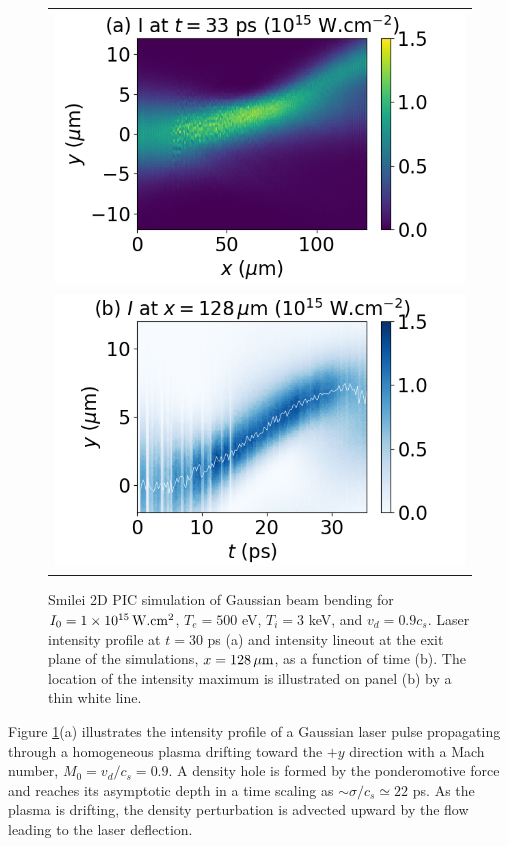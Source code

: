 \documentclass[%
 reprint,
 amsmath,amssymb,
 aps,
]{revtex4-1}
\begin{document}
\begin{figure}
\begin{tabular}{c}
\includegraphics[scale=0.49]{Figure/Ixy_1e15_M1p2_C6+.png} \\
\includegraphics[scale=0.49]{Figure/Iyt_1e15_M1p2_C6+.png}
\end{tabular}
\caption{ \label{fig:pic} Smilei 2D PIC simulation of Gaussian beam bending for $I_0 = 1\times 10^{15} \,\rm W.cm^2$, $T_e=500$ eV, $T_i=3$ keV, and $ v_d=0.9c_s$.
Laser intensity profile at $t = 30$ ps (a) and intensity lineout at the exit plane of the simulations,  $x = 128 \,\rm\mu m$, as  a function of time (b). The location of the  intensity maximum is illustrated on panel (b) by a thin white line.
}
\end{figure}
Figure \ref{fig:pic}(a) illustrates the intensity profile of a Gaussian laser pulse propagating through a homogeneous plasma drifting toward the $+y$ direction with a  Mach number, $M_0=v_d/c_s=0.9$. A density hole is formed by the ponderomotive force and reaches its asymptotic depth in a time scaling as  $\sim \sigma /c_s \simeq  22$ ps. As the plasma is drifting, the density perturbation is advected upward by the flow leading to  the laser deflection.
\end{document}
